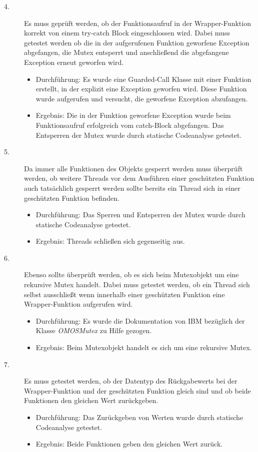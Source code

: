 \begin{description}
	\item[4.]
	Es muss geprüft werden, ob der Funktionsaufruf in der Wrapper-Funktion korrekt von einem try-catch Block eingeschlossen wird. Dabei muss getestet werden ob die in der aufgerufenen Funktion geworfene Exception abgefangen, die Mutex entsperrt und anschließend die abgefangene Exception erneut geworfen wird.
	\begin{itemize}
  		\item{Durchführung:}
			Es wurde eine Guarded-Call Klasse mit einer Funktion erstellt, in der explizit eine Exception geworfen wird. Diese Funktion wurde aufgerufen und versucht, die geworfene Exception abzufangen.
  		\item{Ergebnis:}
			Die in der Funktion geworfene Exception wurde beim Funktionsaufruf erfolgreich vom catch-Block abgefangen. 	Das Entsperren der Mutex wurde durch statische Codeanalyse getestet.
  	\end{itemize}
	
	\item[5.]
	Da immer alle Funktionen des Objekts gesperrt werden muss überprüft werden, ob weitere Threads vor dem Ausführen einer geschützten Funktion auch tatsächlich gesperrt werden sollte bereits ein Thread sich in einer geschützten Funktion befinden.
	\begin{itemize}
  		\item{Durchführung:}
			Das Sperren und Entsperren der Mutex wurde durch statische Codeanalyse getestet.
  		\item{Ergebnis:}
			Threads schließen sich gegenseitig aus.
  	\end{itemize}
	
	\item[6.]
	Ebenso sollte überprüft werden, ob es sich beim Mutexobjekt um eine rekursive Mutex handelt. Dabei muss getestet werden, ob ein Thread sich selbst ausschließt wenn innerhalb einer geschützten Funktion eine Wrapper-Funktion aufgerufen wird.
	\begin{itemize}
  		\item{Durchführung:}
			Es wurde die Dokumentation von IBM bezüglich der Klasse \textit{OMOSMutex} zu Hilfe gezogen.
  		\item{Ergebnis:}
			Beim Mutexobjekt handelt es sich um eine rekursive Mutex.
  	\end{itemize}
	
	\item[7.]
	Es muss getestet werden, ob der Datentyp des Rückgabewerts bei der Wrapper-Funktion und der geschützten Funktion gleich sind und ob beide Funktionen den gleichen Wert zurückgeben.
	\begin{itemize}
  		\item{Durchführung:}
			Das Zurückgeben von Werten wurde durch statische Codeanalyse getestet.
  		\item{Ergebnis:}
			Beide Funktionen geben den gleichen Wert zurück.
  	\end{itemize}
	
	
\end{description}

